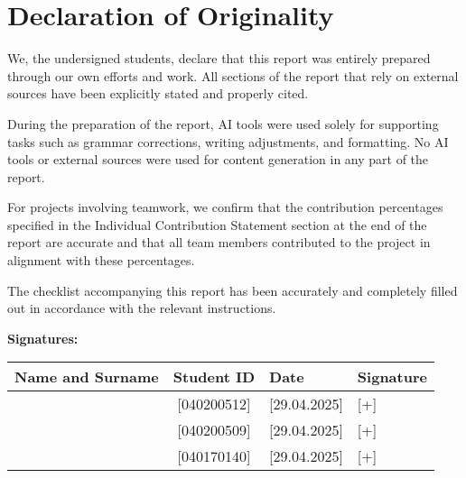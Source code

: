 \cleardoublepage{}
{}\mtcaddchapter 
\chapter*{Declaration of Originality}
\addtocounter{counter}{-1}


We, the undersigned students, declare that this report was entirely prepared through our own efforts and work. All sections of the report that rely on external sources have been explicitly stated and properly cited.

During the preparation of the report, AI tools were used solely for supporting tasks such as grammar corrections, writing adjustments, and formatting. No AI tools or external sources were used for content generation in any part of the report.

For projects involving teamwork, we confirm that the contribution percentages specified in the Individual Contribution Statement section at the end of the report are accurate and that all team members contributed to the project in alignment with these percentages.

The checklist accompanying this report has been accurately and completely filled out in accordance with the relevant instructions.

\textbf{Signatures:}

\renewcommand{\arraystretch}{2} %
\begin{table}[h]
    \centering
    \begin{tabular}{|l|c|m{3cm}|m{4cm}|} %
        \hline
        \textbf{Name and Surname} & \textbf{Student ID} & \textbf{Date} & \textbf{Signature} \\
        \hline
        [Kürşat Döşkaya] & [040200512] & [29.04.2025] & [+] \\
        \hline
        [Kenan Selçuk] & [040200509] & [29.04.2025]  & [+]  \\
        \hline
        [Burak Uğur] & [040170140] & [29.04.2025]  & [+]  \\
        \hline
    \end{tabular}
\end{table}




